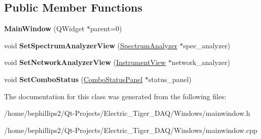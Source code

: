 \subsection*{Public Member Functions}
\begin{DoxyCompactItemize}
\item 
{\bfseries Main\+Window} (Q\+Widget $\ast$parent=0)\hypertarget{class_main_window_a8b244be8b7b7db1b08de2a2acb9409db}{}\label{class_main_window_a8b244be8b7b7db1b08de2a2acb9409db}

\item 
void {\bfseries Set\+Spectrum\+Analyzer\+View} (\hyperlink{class_spectrum_analyzer}{Spectrum\+Analyzer} $\ast$spec\+\_\+analyzer)\hypertarget{class_main_window_a682438fcbf5c684e47a6a089477d8a8a}{}\label{class_main_window_a682438fcbf5c684e47a6a089477d8a8a}

\item 
void {\bfseries Set\+Network\+Analyzer\+View} (\hyperlink{class_instrument_view}{Instrument\+View} $\ast$network\+\_\+analyzer)\hypertarget{class_main_window_aff3b43153f014e8aac712dbeae7eb255}{}\label{class_main_window_aff3b43153f014e8aac712dbeae7eb255}

\item 
void {\bfseries Set\+Combo\+Status} (\hyperlink{class_combo_status_panel}{Combo\+Status\+Panel} $\ast$status\+\_\+panel)\hypertarget{class_main_window_a656a32c45bc35ea5a66573ecdf49498a}{}\label{class_main_window_a656a32c45bc35ea5a66573ecdf49498a}

\end{DoxyCompactItemize}


The documentation for this class was generated from the following files\+:\begin{DoxyCompactItemize}
\item 
/home/bephillips2/\+Qt-\/\+Projects/\+Electric\+\_\+\+Tiger\+\_\+\+D\+A\+Q/\+Windows/mainwindow.\+h\item 
/home/bephillips2/\+Qt-\/\+Projects/\+Electric\+\_\+\+Tiger\+\_\+\+D\+A\+Q/\+Windows/mainwindow.\+cpp\end{DoxyCompactItemize}
